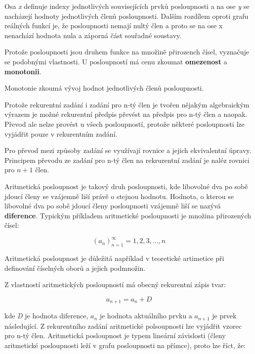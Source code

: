 Osa {\it x} definuje indexy jednotlivých souvisejících prvků posloupnosti a na ose {\it y} se nacházejí hodnoty jednotlivých členů posloupnosti. Dalším rozdílem oproti grafu reálných funkcí je, že posloupnosti nemají nultý člen a proto se na ose {x} nenachází hodnota nula a záporná část souřadné soustavy.


Protože posloupnosti jsou druhem funkce na množině přirozench čísel, vyznačuje se podobnými vlastnosti. U posloupností má cenu zkoumat {\bf omezenost} a {\bf monotonii}.

Monotonie zkoumá vývoj hodnot jednotlivých členů posloupnosti.




Protože rekurentní zadání i zadání pro n-tý člen je tvořen nějakým algebraickým výrazem je možné rekurentní předpis převést na předpis pro n-tý člen a naopak. Převod ale nelze provést u všech posloupností, protože některé posloupnosti lze vyjádřit pouze v rekurentním zadání.

Pro převod mezi způsoby zadání se využívají rovnice a jejich ekvivalentní úpravy. Principem převodu ze zadání pro n-tý člen na rekrurentní zadání je naléz rovnici pro $n+1$ člen.


Aritmetická posloupnost je takový druh posloupnosti, kde libovolné dva po sobě jdoucí členy se vzájemně liší právě o stejnou hodnotu. Hodnota, o kterou se libovolné dva po sobě jdoucí členy posloupnosti vzájemně liší se nazývá {\bf diference}. Typickým příkladem aritmetické posloupnosti je množina přirozených čísel:

$$ (a_n)_{n=1}^{\infty} = 1, 2, 3, ..., n $$

Aritmetická posloupnost je důležitá například v teoretické artimetice při definování číselných oborů a jejich podmnožin.


Z vlastností aritmetických posloupností má obecný rekurentní zápis tvar:

$$ a_{n+1} = a_n + D $$ 

kde {\it D} je hodnota diference, $a_n$ je hodnota aktuálního prvku a $a_{n+1}$ je prvek následující. Z rekurentního zadání aritmetické polsoupnosti lze vyjádřit vzorec pro n-tý člen. Aritmetická posloupnost je typem lineární závislosti (členy aritmetické posloupnosti leží v grafu posloupnosti na přímce), proto lze říct, že:

